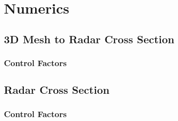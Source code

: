 % 

\section{Numerics}

\subsection{3D Mesh to Radar Cross Section}
%
\begin{frame}\frametitle{Control Factors}
\end{frame}

\subsection{Radar Cross Section}
%
\begin{frame}\frametitle{Control Factors}
\end{frame}
%

\endinput  %

